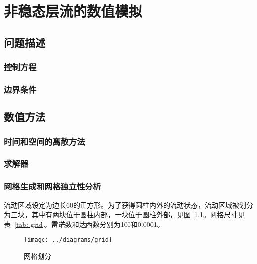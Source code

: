 \chapter{非稳态层流的数值模拟}

\section{问题描述}

\subsection{控制方程} %

\subsection{边界条件} %

\section{数值方法}

\subsection{时间和空间的离散方法}

\subsection{求解器} %

\subsection{网格生成和网格独立性分析}

流动区域设定为边长60的正方形。为了获得圆柱内外的流动状态，流动区域被划分为三块，其中有两块位于圆柱内部，一块位于圆柱外部，见图~\ref{fig: grid}。网格尺寸见表~\ref{tab: grid}。雷诺数和达西数分别为100和0.0001。
\begin{figure}[]
	\centering
	\texttt{[image: ../diagrams/grid]}
	\caption{网格划分}\label{fig: grid}
\end{figure}

